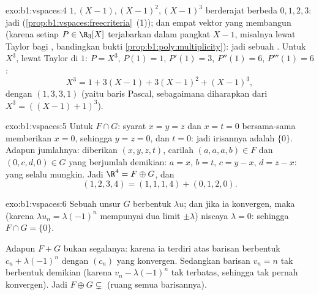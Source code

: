 \begin{solution}{exo:b1:vspaces:4}
 $1, (X-1), (X-1)^2, (X-1)^3$ berderajat berbeda $0,
1, 2, 3$: jadi  (\cref{prop:b1:vspaces:freecriteria}~(1)); dan empat
vektor  yang membangun (karena setiap $P \in \R_3[X]$ terjabarkan dalam pangkat $X -
1$, misalnya lewat Taylor bagi , bandingkan bukti
\cref{prop:b1:poly:multiplicity}): jadi sebuah . Untuk $X^3$, lewat Taylor di
$1$: $P = X^3$, $P(1) = 1$, $P'(1) = 3$, $P''(1) = 6$, $P'''(1) =
6$:
\[
X^3 = 1 + 3(X - 1) + 3(X-1)^2 + (X-1)^3 ,
\]
dengan  $(1, 3, 3, 1)$ (yaitu baris Pascal, sebagaimana diharapkan dari $X^3 =
((X-1)+1)^3$).
\end{solution}

\begin{solution}{exo:b1:vspaces:5}
Untuk $F \cap G$: syarat $x = y = z$ dan $x = t = 0$ bersama-sama memberikan
$x = 0$, sehingga $y = z = 0$, dan $t = 0$: jadi irisannya adalah
$\{0\}$. Adapun jumlahnya: diberikan $(x,y,z,t)$, carilah $(a,a,a,b) \in F$ dan
$(0,c,d,0) \in G$ yang berjumlah demikian: $a = x$, $b = t$, $c = y - x$, $d =
z - x$: yang selalu mungkin. Jadi $\R^4 = F \oplus G$, dan
\[
(1,2,3,4) = (1,1,1,4) + (0,1,2,0) .
\]
\end{solution}

\begin{solution}{exo:b1:vspaces:6}
Sebuah unsur $G$ berbentuk $\lambda u$; dan jika ia konvergen, maka (karena
$\lambda u_n = \lambda(-1)^n$ mempunyai dua limit  $\pm
\lambda$) niscaya $\lambda = 0$: sehingga $F \cap G = \{0\}$.

Adapun $F + G$ bukan segalanya: karena ia terdiri atas barisan berbentuk
$c_n + \lambda(-1)^n$ dengan $(c_n)$ yang konvergen. Sedangkan barisan $v_n =
n$ tak berbentuk demikian (karena $v_n - \lambda(-1)^n$ tak terbatas, sehingga tak pernah
konvergen). Jadi $F \oplus G \subsetneq$ (ruang semua barisannya).
\end{solution}

